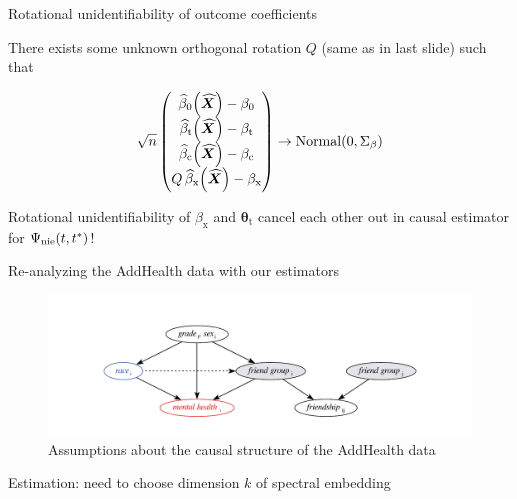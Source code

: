 \documentclass{beamer}
\theoremstyle{remark}
\newcommand{\X}{\bm X}
\newcommand{\Xhat}{\widehat{\X}}
\newcommand{\thetat}{\bm \theta_\text{t}}
\newcommand{\betazero}{\beta_0}
\newcommand{\betat}{\beta_\text{t}}
\newcommand{\betac}{\beta_\text{c}}
\newcommand{\betax}{\beta_\text{x}}
\newcommand \betazerohat [1] {\widehat{\beta}_0 \paren*{#1}}
\newcommand \betathat [1] {\widehat{\beta}_\text{t} \paren*{#1}}
\newcommand \betachat [1] {\widehat{\beta}_\text{c} \paren*{#1}}
\newcommand \betaxhat [1] {\widehat{\beta}_\text{x} \paren*{#1}}
\newcommand{\nie}{\Psi_\text{nie} \paren*{t, t^*}}
\DeclarePairedDelimiter{\paren}{(}{)}
\begin{document}
\begin{frame}{Rotational unidentifiability of outcome coefficients}

    There exists some unknown orthogonal rotation $Q$ (same as in last slide) such that

    \begin{align*}
        \sqrt n
        \begin{pmatrix}
            \betazerohat{\Xhat} - \betazero \\
            \betathat{\Xhat} - \betat       \\
            \betachat{\Xhat} - \betac       \\
            Q \, \betaxhat{\Xhat} - \betax
        \end{pmatrix}
        \to
        \mathrm{Normal} \paren*{0, \Sigma_\beta}
    \end{align*}

    Rotational unidentifiability of $\betax$ and $\thetat$ cancel each other out in causal estimator for $\nie$!
\end{frame}

\begin{frame}{Re-analyzing the AddHealth data with our estimators}

    \centering

    \begin{figure}
        \includegraphics[width=\textwidth]{figures/addhealth-dag.pdf}
        \caption{Assumptions about the causal structure of the AddHealth data}
        \label{fig:addhealth-dag}
    \end{figure}

    Estimation: need to choose dimension $k$ of spectral embedding

\end{frame}
\end{document}

